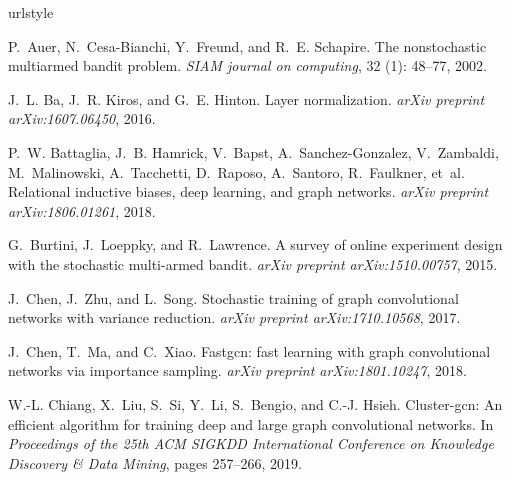 \documentclass{article}
\begin{document}
\begin{thebibliography}{25}
\providecommand{\natexlab}[1]{#1}
\providecommand{\url}[1]{\texttt{#1}}
\expandafter\ifx\csname urlstyle\endcsname\relax
  \providecommand{\doi}[1]{doi: #1}\else
  \providecommand{\doi}{doi: \begingroup \urlstyle{rm}\Url}\fi

P.~Auer, N.~Cesa-Bianchi, Y.~Freund, and R.~E. Schapire.
\newblock The nonstochastic multiarmed bandit problem.
\newblock \emph{SIAM journal on computing}, 32 (1): 48--77,
  2002.

J.~L. Ba, J.~R. Kiros, and G.~E. Hinton.
\newblock Layer normalization.
\newblock \emph{arXiv preprint arXiv:1607.06450}, 2016.

P.~W. Battaglia, J.~B. Hamrick, V.~Bapst, A.~Sanchez-Gonzalez, V.~Zambaldi,
  M.~Malinowski, A.~Tacchetti, D.~Raposo, A.~Santoro, R.~Faulkner, et~al.
\newblock Relational inductive biases, deep learning, and graph networks.
\newblock \emph{arXiv preprint arXiv:1806.01261}, 2018.

G.~Burtini, J.~Loeppky, and R.~Lawrence.
\newblock A survey of online experiment design with the stochastic multi-armed
  bandit.
\newblock \emph{arXiv preprint arXiv:1510.00757}, 2015.

J.~Chen, J.~Zhu, and L.~Song.
\newblock Stochastic training of graph convolutional networks with variance
  reduction.
\newblock \emph{arXiv preprint arXiv:1710.10568}, 2017.

J.~Chen, T.~Ma, and C.~Xiao.
\newblock Fastgcn: fast learning with graph convolutional networks via
  importance sampling.
\newblock \emph{arXiv preprint arXiv:1801.10247}, 2018.

W.-L. Chiang, X.~Liu, S.~Si, Y.~Li, S.~Bengio, and C.-J. Hsieh.
\newblock Cluster-gcn: An efficient algorithm for training deep and large graph
  convolutional networks.
\newblock In \emph{Proceedings of the 25th ACM SIGKDD International Conference
  on Knowledge Discovery \& Data Mining}, pages 257--266, 2019.


\end{thebibliography}
\end{document}
